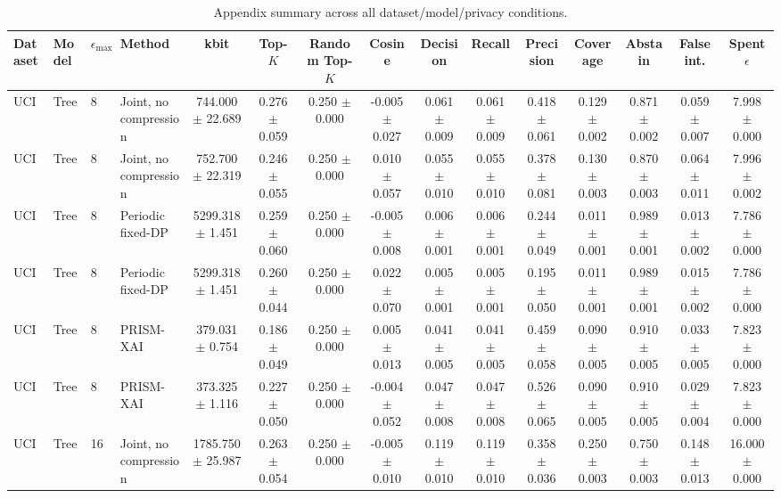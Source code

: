 \begin{table}[t]
\caption{Appendix summary across all dataset/model/privacy conditions.}
\label{tab:appendix-conditions}
\centering
\scriptsize
\setlength{\tabcolsep}{2.5pt}
\begin{tabular}{llllccccccccccc}
\toprule
Dataset & Model & $\epsilon_{\max}$ & Method & kbit & Top-$K$ & Random Top-$K$ & Cosine & Decision & Recall & Precision & Coverage & Abstain & False int. & Spent $\epsilon$ \\
\midrule
UCI & Tree & 8 & Joint, no compression & 744.000 $\pm$ 22.689 & 0.276 $\pm$ 0.059 & 0.250 $\pm$ 0.000 & -0.005 $\pm$ 0.027 & 0.061 $\pm$ 0.009 & 0.061 $\pm$ 0.009 & 0.418 $\pm$ 0.061 & 0.129 $\pm$ 0.002 & 0.871 $\pm$ 0.002 & 0.059 $\pm$ 0.007 & 7.998 $\pm$ 0.000 \\
UCI & Tree & 8 & Joint, no compression & 752.700 $\pm$ 22.319 & 0.246 $\pm$ 0.055 & 0.250 $\pm$ 0.000 & 0.010 $\pm$ 0.057 & 0.055 $\pm$ 0.010 & 0.055 $\pm$ 0.010 & 0.378 $\pm$ 0.081 & 0.130 $\pm$ 0.003 & 0.870 $\pm$ 0.003 & 0.064 $\pm$ 0.011 & 7.996 $\pm$ 0.002 \\
UCI & Tree & 8 & Periodic fixed-DP & 5299.318 $\pm$ 1.451 & 0.259 $\pm$ 0.060 & 0.250 $\pm$ 0.000 & -0.005 $\pm$ 0.008 & 0.006 $\pm$ 0.001 & 0.006 $\pm$ 0.001 & 0.244 $\pm$ 0.049 & 0.011 $\pm$ 0.001 & 0.989 $\pm$ 0.001 & 0.013 $\pm$ 0.002 & 7.786 $\pm$ 0.000 \\
UCI & Tree & 8 & Periodic fixed-DP & 5299.318 $\pm$ 1.451 & 0.260 $\pm$ 0.044 & 0.250 $\pm$ 0.000 & 0.022 $\pm$ 0.070 & 0.005 $\pm$ 0.001 & 0.005 $\pm$ 0.001 & 0.195 $\pm$ 0.050 & 0.011 $\pm$ 0.001 & 0.989 $\pm$ 0.001 & 0.015 $\pm$ 0.002 & 7.786 $\pm$ 0.000 \\
UCI & Tree & 8 & PRISM-XAI & 379.031 $\pm$ 0.754 & 0.186 $\pm$ 0.049 & 0.250 $\pm$ 0.000 & 0.005 $\pm$ 0.013 & 0.041 $\pm$ 0.005 & 0.041 $\pm$ 0.005 & 0.459 $\pm$ 0.058 & 0.090 $\pm$ 0.005 & 0.910 $\pm$ 0.005 & 0.033 $\pm$ 0.005 & 7.823 $\pm$ 0.000 \\
UCI & Tree & 8 & PRISM-XAI & 373.325 $\pm$ 1.116 & 0.227 $\pm$ 0.050 & 0.250 $\pm$ 0.000 & -0.004 $\pm$ 0.052 & 0.047 $\pm$ 0.008 & 0.047 $\pm$ 0.008 & 0.526 $\pm$ 0.065 & 0.090 $\pm$ 0.005 & 0.910 $\pm$ 0.005 & 0.029 $\pm$ 0.004 & 7.823 $\pm$ 0.000 \\
UCI & Tree & 16 & Joint, no compression & 1785.750 $\pm$ 25.987 & 0.263 $\pm$ 0.054 & 0.250 $\pm$ 0.000 & -0.005 $\pm$ 0.010 & 0.119 $\pm$ 0.010 & 0.119 $\pm$ 0.010 & 0.358 $\pm$ 0.036 & 0.250 $\pm$ 0.003 & 0.750 $\pm$ 0.003 & 0.148 $\pm$ 0.013 & 16.000 $\pm$ 0.000 \\

\end{tabular}
\end{table}
